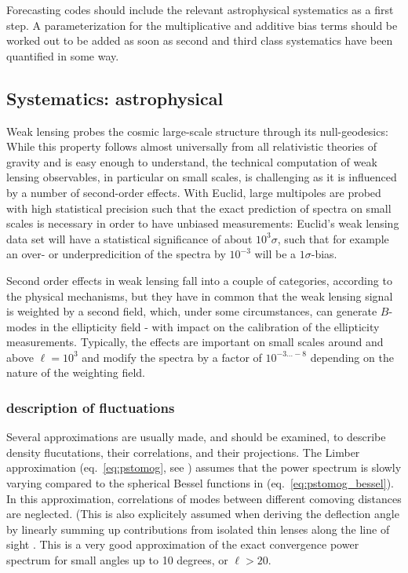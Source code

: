 Forecasting codes should include the relevant astrophysical systematics as a first step. A parameterization for the multiplicative and additive bias terms should be worked out to be added as soon as second and third class systematics have been quantified in some way.




\subsection{Systematics: astrophysical}
\label{sec:lensing_systematics}

Weak lensing probes the cosmic large-scale structure through its null-geodesics: While this property follows almost universally from all relativistic theories of gravity and is easy enough to understand, the technical computation of weak lensing observables, in particular on small scales, is challenging as it is influenced by a number of second-order effects. With Euclid, large multipoles are probed with high statistical precision such that the exact prediction of spectra on small scales is necessary in order to have unbiased measurements: Euclid's weak lensing data set will have a statistical significance of about $10^3\sigma$, such that for example an over- or underpredicition of the spectra by $10^{-3}$ will be a $1\sigma$-bias.

Second order effects in weak lensing fall into a couple of categories, according to the physical mechanisms, but they have in common that the weak lensing signal is weighted by a second field, which, under some circumstances, can generate $B$-modes in the ellipticity field - with impact on the calibration of the ellipticity measurements. Typically, the effects are important on small scales around and above $\ell=10^3$ and modify the spectra by a factor of $10^{-3\ldots-8}$ depending on the nature of the weighting field.

\subsubsection{description of fluctuations}

Several approximations are usually made, and should be examined, to describe
density flucutations, their correlations, and their projections. The Limber
approximation (eq.~\ref{eq:pstomog}, see
\cite{1953ApJ...117..134L,1992ApJ...388..272K}) assumes that the power spectrum
is slowly varying compared to the spherical Bessel functions in
(eq.~\ref{eq:pstomog_bessel}). In this approximation, correlations of modes
between different comoving distances are neglected. (This is also explicitely
assumed when deriving the deflection angle by linearly summing up
contributions from isolated thin lenses along the line of sight
\cite{1994CQGra..11.2345S}. This is a very good approximation of the exact convergence
power spectrum for small angles up to 10 degrees, or $\ell > 20$.

